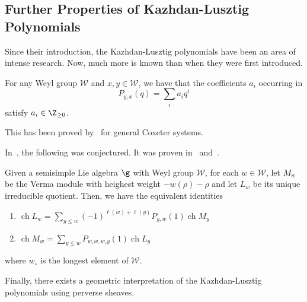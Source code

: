 \documentclass[11pt,leqno,oneside]{amsart}
\numberwithin{thm}{section}
\renewcommand{\W}{\mathcal{W}}
\DeclareMathOperator{\ch}{ch}
\begin{document}
\subsection{Further Properties of Kazhdan-Lusztig Polynomials}
Since their introduction, the Kazhdan-Lusztig polynomials have been an
area of intense research. Now, much more is known than when they were
first introduced.
\begin{prop}
  \cite{kl2} For any Weyl group \(\W\) and \(x,y \in \W\), we have that the
  coefficients \(a_i\) occurring in \[
    P_{y,x}(q) = \sum_i a_i q^i
  \]
  satisfy \(a_i \in \Z_{\geq 0}\).
\end{prop}
\begin{rmk}
  This has been proved by~\cite{elias-williamson} for general Coxeter
  systems. 
\end{rmk}
In~\cite{kl}, the following was conjectured. It was proven
in~\cite{bb} and~\cite{bk}.
\begin{prop}
  Given a semisimple Lie algebra \(\g\) with Weyl group \(\W\), for
  each \(w \in \W\), let \(M_w\) be the Verma module with heighest
  weight \(-w(\rho)-\rho\) and let \(L_w\) be its unique irreducible
  quotient. Then, we have the equivalent identities
  \begin{enumerate}
  \item \(\ch L_w = \sum_{y \leq w} (-1)^{\ell(w)+\ell(y)} P_{y,w}(1)
    \ch M_y\)
  \item \(\ch M_w = \sum_{y \leq w} P_{w_\circ w, w_\circ y}(1) \ch L_y\)
  \end{enumerate}
  where \(w_\circ\) is the longest element of \(\W\). 
\end{prop}
Finally, there exists a geometric interpretation of the
Kazhdan-Lusztig polynomials using perverse sheaves.
\end{document}
